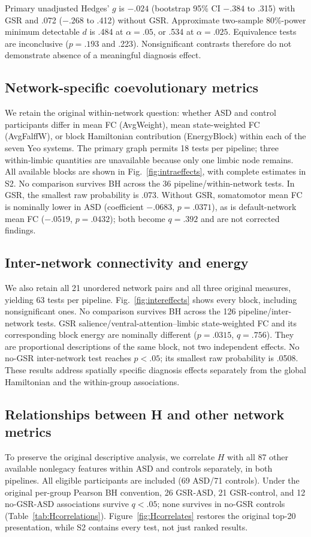 \documentclass[10pt,letterpaper]{article}
\begin{document}
Primary unadjusted Hedges' $g$ is $-.024$ (bootstrap 95\% CI $-.384$ to .315)
with GSR and .072 ($-.268$ to .412) without GSR. Approximate two-sample 80\%-power
minimum detectable $d$ is .484 at $\alpha=.05$, or .534 at $\alpha=.025$.
Equivalence tests are inconclusive ($p=.193$ and .223). Nonsignificant contrasts
therefore do not demonstrate absence of a meaningful diagnosis effect.

\subsection*{Network-specific coevolutionary metrics}
We retain the original within-network question: whether ASD and control
participants differ in mean FC (AvgWeight), mean state-weighted FC (AvgFalffW),
or block Hamiltonian contribution (EnergyBlock) within each of the seven Yeo
systems. The primary graph permits 18 tests per pipeline; three within-limbic
quantities are unavailable because only one limbic node remains. All available
blocks are shown in Fig.~\ref{fig:intraeffects}, with complete estimates in S2.
No comparison survives BH across the 36 pipeline/within-network tests. In GSR,
the smallest raw probability is .073. Without GSR, somatomotor mean FC is
nominally lower in ASD (coefficient $-.0683$, $p=.0371$), as is default-network
mean FC ($-.0519$, $p=.0432$); both become $q=.392$ and are not corrected findings.

\subsection*{Inter-network connectivity and energy}
We also retain all 21 unordered network pairs and all three original measures,
yielding 63 tests per pipeline. Fig.~\ref{fig:intereffects} shows every block,
including nonsignificant ones. No comparison survives BH across the 126
pipeline/inter-network tests. GSR salience/ventral-attention--limbic state-weighted
FC and its corresponding block energy are nominally different ($p=.0315$,
$q=.756$). They are proportional descriptions of the same block, not two
independent effects. No no-GSR inter-network test reaches $p<.05$; its smallest
raw probability is .0508. These results address spatially specific diagnosis
effects separately from the global Hamiltonian and the within-group associations.

\subsection*{Relationships between H and other network metrics}
To preserve the original descriptive analysis, we correlate $H$ with all 87 other
available nonlegacy features within ASD and controls separately, in both pipelines.
All eligible participants are included (69 ASD/71 controls). Under the original
per-group Pearson BH convention, 26 GSR-ASD, 21 GSR-control, and 12 no-GSR-ASD
associations survive $q<.05$; none survives in no-GSR controls
(Table~\ref{tab:Hcorrelations}). Figure~\ref{fig:Hcorrelates} restores the
original top-20 presentation, while S2 contains every test, not just ranked results.
\end{document}
